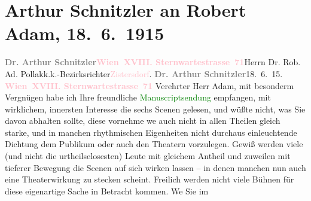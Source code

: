 

               \section[Arthur Schnitzler an Robert Adam, 18. 6. 1915]{ Arthur Schnitzler an Robert Adam, 18. 6. 1915}\nopagebreak{}\rehead{ }\normalsize\beginnumbering{} \toendnotes[C]{\smallbreak\pagebreak[2]} 
\toendnotes[C]{\smallbreak}\pstart{}{\pb}\textcolor{gray}{\textbf{Dr. Arthur Schnitzler}}\pend{}\pstart{}\textcolor{gray}{\textbf{\textcolor{pink}{Wien XVIII. Sternwartestrasse 71}{}\ledrightnote{\textcolor{pink}{Sternwartestraße}}}}\pend{}{\bigskip}\pstart{}{\pb}Herrn Dr. Rob. Ad. Pollak\pend{}\pstart{}k.k.-Bezirksrichter\pend{}\pstart{}\textcolor{pink}{Zistersdorf}{}\ledrightnote{\textcolor{pink}{Zistersdorf}}.\pend{}{\bigskip}\pstart
           \noindent{}{\pb}\textcolor{gray}{\textbf{Dr. Arthur Schnitzler}}\hfill 18. 6. 15.\pend
           \pstart
           \textcolor{gray}{\textbf{\textcolor{pink}{Wien XVIII. Sternwartestrasse 71}{}\ledrightnote{\textcolor{pink}{Sternwartestraße}}}}\pend
           \pstart{}Verehrter Herr Adam,\pend\pstart
           mit besonderm Vergnügen habe ich Ihre freundliche \textcolor{green}{Manuscriptsendung}{} empfangen, mit wirklichem,
                    innersten Interesse die sechs Scenen gelesen, und wüßte nicht, was Sie davon
                    abhalten sollte, diese vornehme we{\geminationn} auch nicht in
                    allen Theilen gleich starke, und in manchen rhythmischen Eigenheiten nicht
                    durchaus einleuchtende Dichtung dem Publikum oder auch den Theatern vorzulegen.
                    Gewiß werden viele (und nicht die urtheilselosesten) {\pb}\introOben{}Leute\introOben{} mit gleichem Antheil und zuweilen mit tieferer
                    Bewegung die Scenen auf sich wirken lassen – in denen manchen nun auch eine
                    Theaterwirkung zu stecken scheint. Freilich werden nicht viele Bühnen für diese
                    eigenartige Sache in Betracht kommen. We{\geminationn} Sie im
